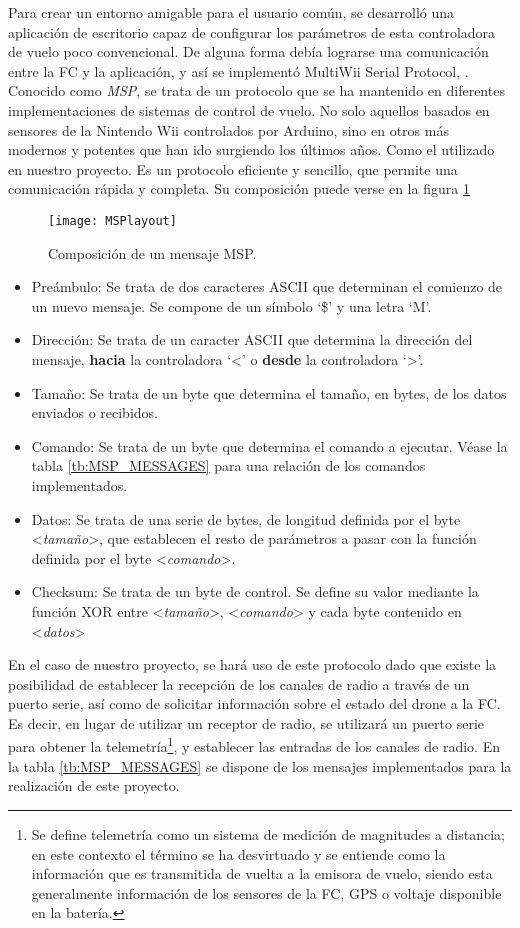 Para crear un entorno amigable para el usuario común, se desarrolló una aplicación de escritorio capaz de configurar los parámetros de esta controladora de vuelo poco convencional. De alguna forma debía lograrse una comunicación entre la FC y la aplicación, y así se implementó MultiWii Serial Protocol, \citep{wiki:MSPDefinition}.\\Conocido como \textit{MSP}, se trata de un protocolo que se ha mantenido en diferentes implementaciones de sistemas de control de vuelo. No solo aquellos basados en sensores de la Nintendo Wii controlados por Arduino, sino en otros más modernos y potentes que han ido surgiendo los últimos años. Como el utilizado en nuestro proyecto.
\newpage
Es un protocolo eficiente y sencillo, que permite una comunicación rápida y completa. Su composición puede verse en la figura \ref{fig:MSPlayout}
\begin{figure}[H]
	\centering
	\texttt{[image: MSPlayout]}
	\caption{Composición de un mensaje MSP.}\label{fig:MSPlayout}
\end{figure}

\begin{itemize}
\item Preámbulo: Se trata de dos caracteres ASCII que determinan el comienzo de un nuevo mensaje. Se compone de un símbolo `\$' y una letra `M'.
\item Dirección: Se trata de un caracter ASCII que determina la dirección del mensaje, \textbf{hacia} la controladora `<' o \textbf{desde} la controladora `>'.
\item Tamaño: Se trata de un byte que determina el tamaño, en bytes, de los datos enviados o recibidos.
\item Comando: Se trata de un byte que determina el comando a ejecutar. Véase la tabla  \ref{tb:MSP_MESSAGES} para una relación de los comandos implementados.
\item Datos: Se trata de una serie de bytes, de longitud definida por el byte <\textit{tamaño}>, que establecen el resto de parámetros a pasar con la función definida por el byte <\textit{comando}>.
\item Checksum: Se trata de un byte de control. Se define su valor mediante la función XOR entre <\textit{tamaño}>, <\textit{comando}> y cada byte contenido en <\textit{datos}>


\end{itemize}

En el caso de nuestro proyecto, se hará uso de este protocolo dado que existe la posibilidad de establecer la recepción de los canales de radio a través de un puerto serie, así como de solicitar información sobre el estado del drone a la FC. Es decir, en lugar de utilizar un receptor de radio, se utilizará un puerto serie para obtener la telemetría\footnote{Se define telemetría como un sistema de medición de magnitudes a distancia; en este contexto el término se ha desvirtuado y se entiende como la información que es transmitida de vuelta a la emisora de vuelo, siendo esta generalmente información de los sensores de la FC, GPS o voltaje disponible en la batería.}, y establecer las entradas de los canales de radio. 
En la tabla \ref{tb:MSP_MESSAGES} se dispone de los mensajes implementados para la realización de este proyecto. 


